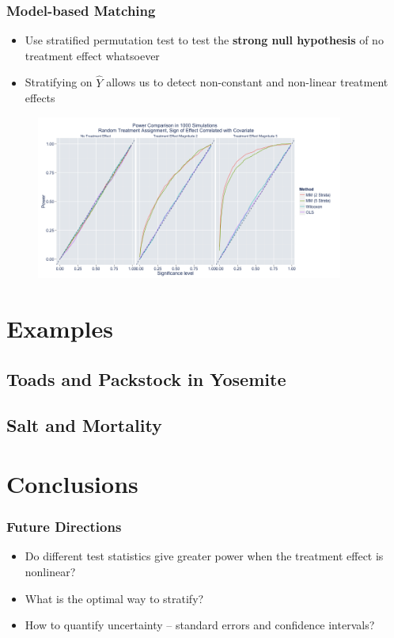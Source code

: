 \documentclass{beamer}
\begin{document}
\frame
{
  \frametitle{Model-based Matching}
\begin{center}
\begin{itemize}
\item Use stratified permutation test to test the \textbf{strong null hypothesis} of no treatment effect whatsoever
\item Stratifying on $\hat{Y}$ allows us to detect non-constant and non-linear treatment effects
\end{itemize}

\begin{figure}[htbp]
\begin{center}
\includegraphics[width = 0.9\textwidth]{fig/power.png}
\end{center}
\end{figure}


\end{center}
}

\section[Examples]{Examples}

\subsection[Toads and Packstock in Yosemite]{Toads and Packstock in Yosemite}
\subsection[Salt and Mortality]{Salt and Mortality}

\section[Conclusions]{Conclusions}
\frame
{
  \frametitle{Future Directions}
\begin{center}
\begin{itemize}
\item Do different test statistics give greater power when the treatment effect is nonlinear?
\item What is the optimal way to stratify?
\item How to quantify uncertainty -- standard errors and confidence intervals?
\end{itemize}
\end{center}
}



%
%
%
\end{document}
